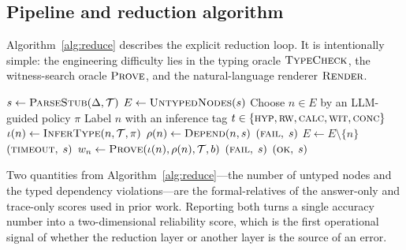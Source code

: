 \documentclass[11pt,a4paper]{article}
\newcommand{\IR}{\textsc{ir}}
\begin{document}
\subsection{Pipeline and reduction algorithm}
\label{ssec:algo}

Algorithm~\ref{alg:reduce} describes the explicit reduction loop.  It
is intentionally simple: the engineering difficulty lies in the
typing oracle $\textsc{TypeCheck}$, the witness-search oracle
$\textsc{Prove}$, and the natural-language renderer
$\textsc{Render}$.

\begin{algorithm}[t]
\caption{Semantic reduction $R$: from a natural-language derivation
$\Delta$ to a typed \IR{} $s$ discharged by a verifier.}
\label{alg:reduce}
\begin{algorithmic}[1]
  \State $s \gets \textsc{ParseStub}(\Delta, \mathcal{T})$ 
  \State $E \gets \textsc{UntypedNodes}(s)$
    \State Choose $n \in E$ by an LLM-guided policy $\pi$
    \State Label $n$ with an inference tag $t \in \{\textsc{hyp},
            \textsc{rw}, \textsc{calc}, \textsc{wit}, \textsc{conc}\}$
    \State $\iota(n) \gets \textsc{InferType}(n, \mathcal{T}, \pi)$  
    \State $\rho(n) \gets \textsc{Depend}(n, s)$
      \State \Return $(\textsc{fail},\; s)$ 
    \EndIf
    \State $E \gets E \setminus \{n\}$
  \EndWhile
    \State \Return $(\textsc{timeout},\; s)$
  \EndIf
  \State {}
    \State $w_n \gets \textsc{Prove}(\iota(n), \rho(n), \mathcal{T}, b)$
      \State \Return $(\textsc{fail},\; s)$ 
    \EndIf
  \EndFor
  \State \Return $(\textsc{ok},\; s)$
\EndProcedure
\end{algorithmic}
\end{algorithm}

Two quantities from Algorithm~\ref{alg:reduce}---the number of
untyped nodes and the typed dependency violations---are the
formal-relatives of the answer-only and trace-only scores used in
prior work.  Reporting both turns a single accuracy number into a
two-dimensional reliability score, which is the first operational
signal of whether the reduction layer or another layer is the source
of an error.
\end{document}
